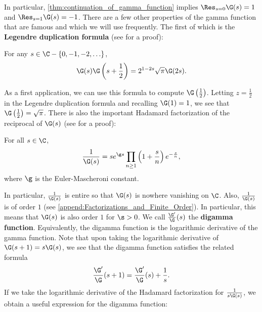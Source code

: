     In particular, \cref{thm:continuation_of_gamma_function} implies $\Res_{s = 0}\G(s) = 1$ and $\Res_{s = 1}\G(s) = -1$. There are a few other properties of the gamma function that are famous and which we will use frequently. The first of which is the \textbf{Legendre duplication formula} (see \cite{remmert1998classical} for a proof):

    \begin{theorem}
      For any $s \in \C-\{0,-1,-2,\ldots\}$,
      \[
        \G(s)\G\left(s+\frac{1}{2}\right) = 2^{1-2s}\sqrt{\pi}\G(2s).
      \]
    \end{theorem}

    As a first application, we can use this formula to compute $\G\left(\frac{1}{2}\right)$. Letting $z = \frac{1}{2}$ in the Legendre duplication formula and recalling $\G(1) = 1$, we see that $\G\left(\frac{1}{2}\right) = \sqrt{\pi}$. There is also the important Hadamard factorization of the reciprocal of $\G(s)$ (see \cite{stein2003complex} for a proof):

    \begin{proposition}\label{prop:Hadamard_factorization_for_reciprocial_of_gamma}
      For all $s \in \C$,
      \[
        \frac{1}{\G(s)} = se^{\g s}\prod_{n \ge 1}\left(1+\frac{s}{n}\right)e^{-\frac{s}{n}},
      \]
      where $\g$ is the Euler-Mascheroni constant.
    \end{proposition}

    In particular, $\frac{1}{\G(s)}$ is entire so that $\G(s)$ is nowhere vanishing on $\C$. Also, $\frac{1}{\G(s)}$ is of order $1$ (see \cref{append:Factorizations_and_Finite_Order}). In particular, this means that $\G(s)$ is also order $1$ for $\s > 0$. We call $\frac{\G'}{\G}(s)$ the \textbf{digamma function}. Equivalently, the digamma function is the logarithmic derivative of the gamma function. Note that upon taking the logarithmic derivative of $\G(s+1) = s\G(s)$, we see that the digamma function satisfies the related formula
    \[
      \frac{\G'}{\G}(s+1) = \frac{\G'}{\G}(s)+\frac{1}{s}.
    \]
    If we take the logarithmic derivative of the Hadamard factorization for $\frac{1}{s\G(s)}$, we obtain a useful expression for the digamma function:

